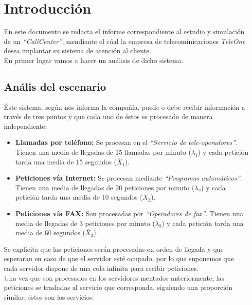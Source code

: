 \section{Introducción}

En este documento se redacta el informe correspondiente al estudio y simulación de un \emph{``CallCenter''}, mendiante el cúal la empresa de telecominicaciones \emph{TeleOne} desea implantar su sistema de atención al cliente.\\

En primer lugar vamos a hacer un análisis de dicho sistema.

\subsection{Anális del escenario}
Éste sistema, según nos informa la compañía, puede o debe recibir información a través de tres puntos y que cada uno de éstos es procesado de manera independiente:

\begin{itemize}
  \item \textbf{Llamadas por teléfono:} Se procesan en el \emph{``Servicio de tele-operadores''}. Tienen una media de llegadas de 15 llamadas por minuto ($\lambda_{1}$) y cada petición tarda una media de 15 segundos ($\overline{X}_{1}$).
  \item \textbf{Peticiones vía Internet:} Se procesan mediante \emph{``Programas automáticos''}. Tienen una media de llegadas de 20 peticiones por minuto ($\lambda_{2}$) y cada petición tarda una media de 10 segundos ($\overline{X}_{2}$).
  \item \textbf{Peticiones vía FAX:} Son procesadas por \emph{``Operadores de fax''}. Tienen una media de llegadas de 3 peticiones por minuto ($\lambda_{3}$) y cada petición tarda una media de 60 segundos ($\overline{X}_{3}$).
\end{itemize}

Se explicita que las peticiones serán procesadas en orden de llegada y que esperaran en caso de que el servidor esté ocupado, por lo que suponemos que cada servidor dispone de una cola infinita para recibir peticiones.\\

Una vez que son procesados en los servidores mentados anteriormente, las peticiones se trasladas al servicio que corresponda, siguiendo una proporción similar, éstos son los servicios:

